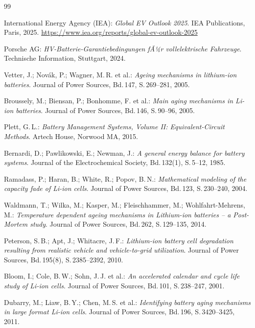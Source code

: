 ﻿\documentclass[a4paper,12pt]{article}
\theoremstyle{definition}
\begin{document}
\begin{thebibliography}{99}

  International Energy Agency (IEA):
  \emph{Global EV Outlook 2025}.
  IEA Publications, Paris, 2025.
  \url{https://www.iea.org/reports/global-ev-outlook-2025}

  Porsche AG:
  \emph{HV-Batterie-Garantiebedingungen fÃ¼r vollelektrische Fahrzeuge}.
  Technische Information, Stuttgart, 2024.

  Vetter, J.; Nov\'ak, P.; Wagner, M.\,R. et al.:
  \emph{Ageing mechanisms in lithium-ion batteries}.
  Journal of Power Sources, Bd.\,147, S.\,269--281, 2005.

  Broussely, M.; Biensan, P.; Bonhomme, F. et al.:
  \emph{Main aging mechanisms in Li-ion batteries}.
  Journal of Power Sources, Bd.\,146, S.\,90--96, 2005.

  Plett, G.\,L.:
  \emph{Battery Management Systems, Volume II: Equivalent-Circuit Methods}.
  Artech House, Norwood MA, 2015.

  Bernardi, D.; Pawlikowski, E.; Newman, J.:
  \emph{A general energy balance for battery systems}.
  Journal of the Electrochemical Society, Bd.\,132(1), S.\,5--12, 1985.

  Ramadass, P.; Haran, B.; White, R.; Popov, B.\,N.:
  \emph{Mathematical modeling of the capacity fade of Li-ion cells}.
  Journal of Power Sources, Bd.\,123, S.\,230--240, 2004.

  Waldmann, T.; Wilka, M.; Kasper, M.; Fleischhammer, M.; Wohlfahrt-Mehrens, M.:
  \emph{Temperature dependent ageing mechanisms in Lithium-ion batteries --
    a Post-Mortem study}.
  Journal of Power Sources, Bd.\,262, S.\,129--135, 2014.

  Peterson, S.\,B.; Apt, J.; Whitacre, J.\,F.:
  \emph{Lithium-ion battery cell degradation resulting from realistic
    vehicle and vehicle-to-grid utilization}.
  Journal of Power Sources, Bd.\,195(8), S.\,2385--2392, 2010.

  Bloom, I.; Cole, B.\,W.; Sohn, J.\,J. et al.:
  \emph{An accelerated calendar and cycle life study of Li-ion cells}.
  Journal of Power Sources, Bd.\,101, S.\,238--247, 2001.

  Dubarry, M.; Liaw, B.\,Y.; Chen, M.\,S. et al.:
  \emph{Identifying battery aging mechanisms in large format Li-ion cells}.
  Journal of Power Sources, Bd.\,196, S.\,3420--3425, 2011.


\end{thebibliography}
\end{document}
